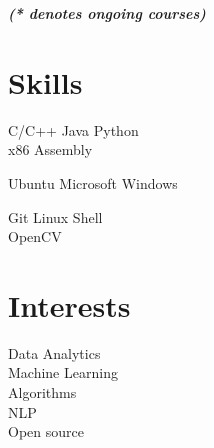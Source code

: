 \documentclass[a4paper]{deedy-resume} %
\begin{document}
\begin{minipage}[t]{0.33\textwidth}
  {\footnotesize \textit{\textbf{(* denotes ongoing courses) }}} \\

  \sectionspace

  \section{Skills}

  \runsubsection{}
  C/C++ \textbullet{} Java \textbullet{} Python \\
  \textbullet{} x86 Assembly

  \sectionspace
  \sectionspace

  Ubuntu \textbullet{} Microsoft Windows

  \sectionspace
  \sectionspace

  Git \textbullet{} Linux Shell  \\
  \textbullet{} OpenCV

  \sectionspace
  \sectionspace

  \section{Interests}
  Data Analytics \\
  Machine Learning \\
  Algorithms \\
  NLP \\
  Open source \\
\end{minipage}
\hfill
\end{document}

